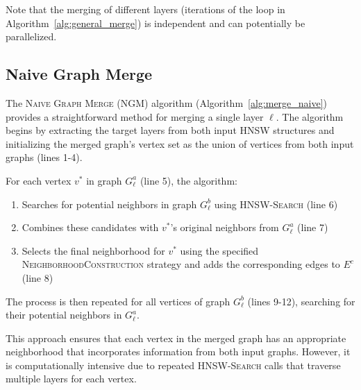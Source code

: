 \documentclass{article}
\begin{document}
Note that the merging of different layers (iterations of the loop in Algorithm~\ref{alg:general_merge}) is independent and can potentially be parallelized.


\subsection{Naive Graph Merge}
The \textsc{Naive Graph Merge} (\textsc{NGM}) algorithm (Algorithm~\ref{alg:merge_naive}) provides a straightforward method for merging a single layer $\ell$. The algorithm begins by extracting the target layers from both input HNSW structures and initializing the merged graph's vertex set as the union of vertices from both input graphs (lines 1-4).

For each vertex $v^*$ in graph $G^a_\ell$ (line 5), the algorithm:
\begin{enumerate}
  \item Searches for potential neighbors in graph $G^b_\ell$ using \textsc{HNSW-Search} (line 6)
  \item Combines these candidates with $v^*$'s original neighbors from $G^a_\ell$ (line 7)
  \item Selects the final neighborhood for $v^*$ using the specified \textsc{NeighborhoodConstruction} strategy and adds the corresponding edges to $E^c$ (line 8)
\end{enumerate}

The process is then repeated for all vertices of graph $G^b_\ell$ (lines 9-12), searching for their potential neighbors in $G^a_\ell$.

This approach ensures that each vertex in the merged graph has an appropriate neighborhood that incorporates information from both input graphs. However, it is computationally intensive due to repeated \textsc{HNSW-Search} calls that traverse multiple layers for each vertex.
\end{document}
